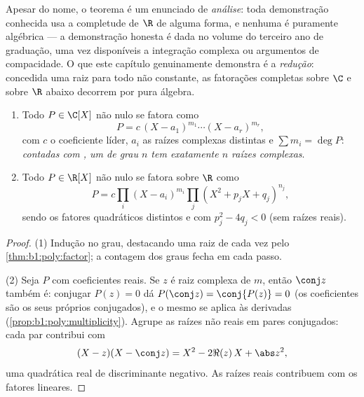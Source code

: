 \begin{remark}
Apesar do nome, o teorema é um enunciado de \emph{análise}:
toda demonstração conhecida usa a completude de $\R$ de alguma forma, e
nenhuma é puramente algébrica --- a demonstração honesta é dada no
volume do terceiro ano de graduação, uma vez disponíveis a integração
complexa ou argumentos de compacidade. O que este capítulo genuinamente
demonstra é a \emph{redução}: concedida uma raiz para todo 
não constante, as fatorações completas sobre $\C$ e sobre $\R$ abaixo
decorrem por pura álgebra.
\end{remark}

\begin{corollary}\label{cor:b1:poly:factorization}
\begin{enumerate}
  \item Todo $P \in \C[X]$ não nulo se fatora como
        \[
        P = c\, (X - a_1)^{m_1} \cdots (X - a_r)^{m_r},
        \]
        com $c$ o coeficiente líder, $a_i$ as raízes complexas
        distintas e $\sum m_i = \deg P$: \emph{contadas com ,
        um  de grau $n$ tem exatamente $n$ raízes complexas}.
  \item Todo $P \in \R[X]$ não nulo se fatora sobre $\R$ como
        \[
        P = c \prod_i (X - a_i)^{m_i} \prod_j (X^2 + p_j X +
        q_j)^{n_j},
        \]
        sendo os fatores quadráticos distintos e com $p_j^2 - 4q_j < 0$
        (sem raízes reais).
\end{enumerate}
\end{corollary}

\begin{proof}
(1) Indução no grau, destacando uma raiz de cada vez pelo
\cref{thm:b1:poly:factor}; a contagem dos graus fecha em cada passo.

(2) Seja $P$ com coeficientes reais. Se $z$ é raiz complexa de
 $m$, então $\conj z$ também é: conjugar $P(z) = 0$ dá
$P(\conj z) = \conj{P(z)} = 0$ (os coeficientes são os seus próprios
conjugados), e o mesmo se aplica às derivadas
(\cref{prop:b1:poly:multiplicity}). Agrupe as raízes não reais em
pares conjugados: cada par contribui com
\[
(X - z)(X - \conj z) = X^2 - 2\Re(z)\, X + \abs z^2 ,
\]
uma quadrática real de discriminante negativo. As raízes reais contribuem
com os fatores lineares.
\end{proof}

